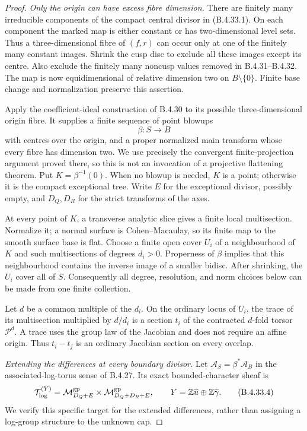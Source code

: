 \begin{proof}
\emph{Only the origin can have excess fibre dimension.}
There are finitely many irreducible components
of the compact central divisor in (B.4.33.1).
On each component the marked map is either
constant or has two-dimensional level sets.
Thus a three-dimensional fibre of $(f,r)$
can occur only at one of the finitely many
constant images. Shrink the cusp disc to
exclude all these images except its centre.
Also exclude the finitely many noncusp values
removed in B.4.31--B.4.32. The map is now
equidimensional of relative dimension two
on $B\setminus\{0\}$. Finite base change
and normalization preserve this assertion.

Apply the coefficient-ideal construction of
B.4.30 to its possible three-dimensional
origin fibre. It supplies a finite sequence
of point blowups
\[
 \beta:S\longrightarrow B
 \tag{B.4.33.3}
\]
with centres over the origin, and a proper
normalized main transform whose every fibre
has dimension two. We use precisely the
convergent finite-projection argument proved
there, so this is not an invocation of a
projective flattening theorem. Put
$K=\beta^{-1}(0)$. When no blowup is needed,
$K$ is a point; otherwise it is the compact
exceptional tree. Write $E$ for the exceptional
divisor, possibly empty, and $D_Q,D_R$ for
the strict transforms of the axes.

At every point of $K$, a transverse analytic
slice gives a finite local multisection.
Normalize it; a normal surface is
Cohen--Macaulay, so its finite map to the
smooth surface base is flat. Choose a finite
open cover $U_i$ of a neighbourhood of $K$
and such multisections of degrees $d_i>0$.
Properness of $\beta$ implies that this
neighbourhood contains the inverse image
of a smaller bidisc. After shrinking, the
$U_i$ cover all of $S$. Consequently all
degree, resolution, and norm choices below
can be made from one finite collection.

Let $d$ be a common multiple of the $d_i$.
On the ordinary locus of $U_i$, the trace
of its multisection multiplied by $d/d_i$
is a section $t_i$ of the contracted
$d$-fold torsor $\mathscr P^d$. A trace
uses the group law of the Jacobian and
does not require an affine origin. Thus
$t_i-t_j$ is an ordinary Jacobian section
on every overlap.

\emph{Extending the differences at every boundary divisor.}
Let $\mathcal A_S=\beta^*\mathcal A_B$ in
the associated-log-torus sense of B.4.27.
Its exact bounded-character sheaf is
\[
 \mathcal T_{\log}^{(Y)}
  =\mathcal M_{D_Q+E}^{\rm gp}
        \times\mathcal M_{D_Q+D_R+E}^{\rm gp},
 \qquad Y=\mathbb Z\widehat u\oplus\mathbb Z\widehat\gamma.
 \tag{B.4.33.4}
\]
We verify this specific target for the
extended differences, rather than assigning
a log-group structure to the unknown cap.


\end{proof}
